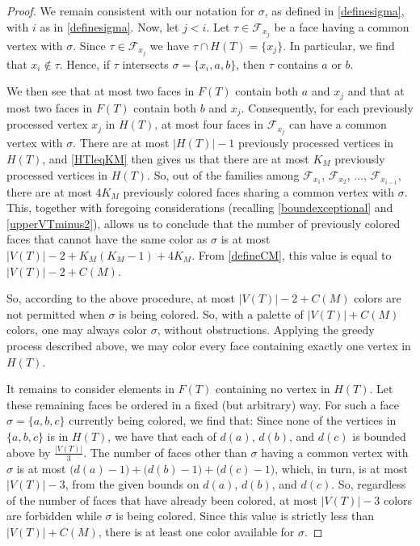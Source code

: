 \documentclass[12pt]{article}
\begin{document}
\begin{proof}
 We remain consistent with our notation for $\sigma$, as defined in \eqref{definesigma}, with $i$ as in \eqref{definesigma}. Now, let
 $j < i$. Let $\tau \in \mathcal{F}_{x_{j}}$ be a face having a common vertex with $\sigma$. 
 Since $\tau \in \mathcal{F}_{x_j}$ we have $\tau \cap H(T) = \{ x_{j} \}$.
 In particular, we find that $x_i \not\in \tau$. 
 Hence, if $\tau$ intersects $\sigma = \{ x_i, a, b \}$, 
 then $\tau$ contains $a$ or $b$. 

 We then see that at most two faces in $F(T)$ contain both $a$ and $x_j$ and that at most two faces in $F(T)$ contain both $b$ and $x_j$. 
 Consequently, for each previously processed vertex $x_j$ in $H(T)$, at most four faces in $\mathcal{F}_{x_j}$ can have a common vertex 
 with $\sigma$. There are at most $|H(T)| - 1$ previously processed vertices in $H(T)$, 
 and \eqref{HTleqKM} then gives us that there are at most $K_M$ previously processed vertices in $H(T)$. 
 So, out of the families among $\mathcal{F}_{x_1}$, $\mathcal{F}_{x_2}$, $\ldots$, $\mathcal{F}_{x_{i-1}}$, 
 there are at most $4 K_M$ previously colored faces 
 sharing a common vertex with $\sigma$. 
 This, together with foregoing considerations (recalling \eqref{boundexceptional} and \eqref{upperVTminus2}), 
 allows us to conclude that the number of previously colored faces that cannot have the same color as $\sigma$
 is at most 
 $\left| V(T) \right| - 2 + K_{M} ( K_{M} - 1 ) + 4 K_M$. 
 From \eqref{defineCM}, this value is equal to 
 $\left| V(T) \right| - 2 + C(M)$. 

 So, according to the above procedure, at most $\left| V(T) \right| - 2 + C(M)$ colors are not permitted when $\sigma $ is being colored. 
 So, with a palette of $\left| V(T) \right| + C(M)$ colors, one may always color $\sigma$, without obstructions. Applying the greedy 
 process described above, 
 we may color every face containing exactly one vertex in $H(T)$. 
 
 It remains to consider elements in $F(T)$ containing no vertex in $H(T)$. Let these remaining faces be ordered in a fixed (but 
 arbitrary) way. For such a face $\sigma = \{ a, b, c \}$ currently being colored, 
 we find that: Since none of the vertices in $\{ a, b, c \}$ is in $H(T)$, 
 we have that each of $d(a)$, $d(b)$, and $d(c)$ is bounded above by $\frac{ \left| V(T) \right| }{3}$. 
 The number of faces other than $\sigma$ having a common vertex with $\sigma$ is at most 
 $\big( d(a) - 1 \big) + \big( d(b) - 1 \big) + \big( d(c) - 1 \big)$, 
 which, in turn, is at most $\left| V(T) \right| - 3$, from the given bounds on $d(a)$, $d(b)$, and $d(c)$. 
 So, regardless of the number of faces that have already been colored, 
 at most $\left| V(T) \right| - 3$ colors are forbidden while $\sigma$ is being colored. 
 Since this value is strictly less than $\left| V(T) \right| + C(M)$, there is at least one color available for $\sigma$. 
 

\end{proof}
\end{document}
